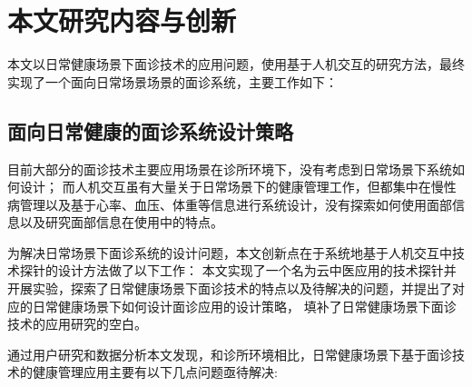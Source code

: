 \section{本文研究内容与创新}

本文以日常健康场景下面诊技术的应用问题，使用基于人机交互的研究方法，最终实现了一个面向日常场景场景的面诊系统，主要工作如下：

\subsection{面向日常健康的面诊系统设计策略}

目前大部分的面诊技术主要应用场景在诊所环境下，没有考虑到日常场景下系统如何设计；
而人机交互虽有大量关于日常场景下的健康管理工作，但都集中在慢性病管理以及基于心率、血压、体重等信息进行系统设计，没有探索如何使用面部信息以及研究面部信息在使用中的特点。

为解决日常场景下面诊系统的设计问题，本文创新点在于系统地基于人机交互中技术探针的设计方法做了以下工作：
本文实现了一个名为云中医应用的技术探针并开展实验，探索了日常健康场景下面诊技术的特点以及待解决的问题，并提出了对应的日常健康场景下如何设计面诊应用的设计策略，
填补了日常健康场景下面诊技术的应用研究的空白\cite{ding2019reading}。

通过用户研究和数据分析本文发现，和诊所环境相比，日常健康场景下基于面诊技术的健康管理应用主要有以下几点问题亟待解决: 

